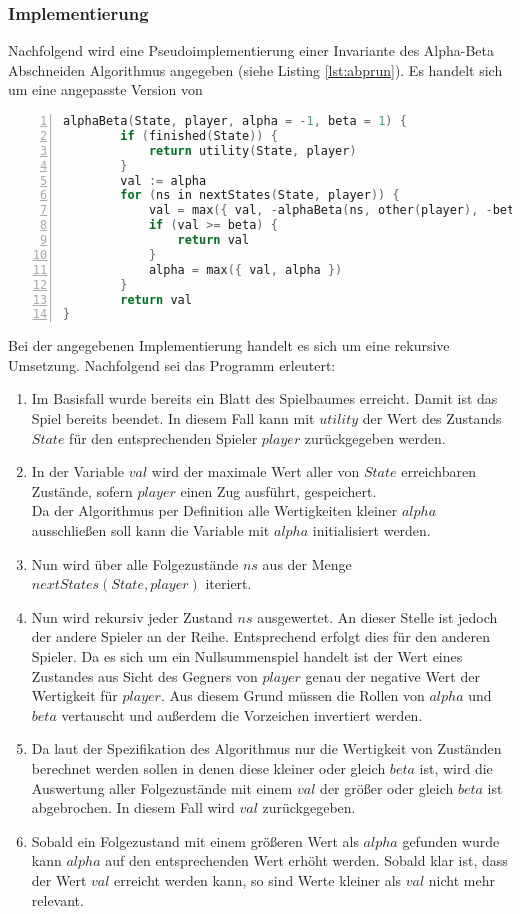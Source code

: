\subsubsection{Implementierung}
Nachfolgend wird eine Pseudoimplementierung einer Invariante des Alpha-Beta Abschneiden Algorithmus angegeben (siehe Listing \ref{lst:abprun}). Es handelt sich um eine angepasste Version von \cite{StroetmannAI19}
\begin{lstlisting}[caption = {Pseudoimplementierung von Alpha-Beta Abschneiden}, language = cpp, captionpos = t , numbers=left, label={lst:abprun}]
alphaBeta(State, player, alpha = -1, beta = 1) {
        if (finished(State)) {
            return utility(State, player)
        }
        val := alpha
        for (ns in nextStates(State, player)) {
            val = max({ val, -alphaBeta(ns, other(player), -beta, -alpha) })
            if (val >= beta) {
                return val
            }
            alpha = max({ val, alpha })
        }
        return val
}
\end{lstlisting}
Bei der angegebenen Implementierung handelt es sich um eine rekursive Umsetzung. Nachfolgend sei das Programm erleutert:
\begin{enumerate}
\item Im Basisfall wurde bereits ein Blatt des Spielbaumes erreicht. Damit ist das Spiel bereits beendet. In diesem Fall kann mit $utility$ der Wert des Zustands $State$ für den entsprechenden Spieler $player$ zurückgegeben werden.
\item In der Variable $val$ wird der maximale Wert aller von $State$ erreichbaren Zustände, sofern $player$ einen Zug ausführt, gespeichert.\\
Da der Algorithmus per Definition alle Wertigkeiten kleiner $alpha$ ausschließen soll kann die Variable mit $alpha$ initialisiert werden.
\item Nun wird über alle Folgezustände $ns$ aus der Menge $nextStates(State, player)$ iteriert.
\item Nun wird rekursiv jeder Zustand $ns$ ausgewertet. An dieser Stelle ist jedoch der andere Spieler an der Reihe. Entsprechend erfolgt dies für den anderen Spieler. Da es sich um ein Nullsummenspiel handelt ist der Wert eines Zustandes aus Sicht des Gegners von $player$ genau der negative Wert der Wertigkeit für $player$. Aus diesem Grund müssen die Rollen von $alpha$ und $beta$ vertauscht und außerdem die Vorzeichen invertiert werden.
\item Da laut der Spezifikation des Algorithmus nur die Wertigkeit von Zuständen berechnet werden sollen in denen diese kleiner oder gleich $beta$ ist, wird die Auswertung aller Folgezustände mit einem $val$ der größer oder gleich $beta$ ist abgebrochen. In diesem Fall wird $val$ zurückgegeben.
\item Sobald ein Folgezustand mit einem größeren Wert als $alpha$ gefunden wurde kann $alpha$ auf den entsprechenden Wert erhöht werden. Sobald klar ist, dass der Wert $val$ erreicht werden kann, so sind Werte kleiner als $val$ nicht mehr relevant.  
 
\end{enumerate}

